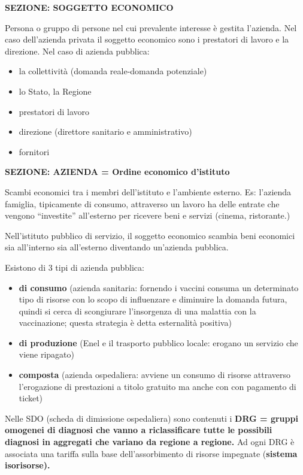 \documentclass[]{article}
\begin{document}
\textbf{SEZIONE: SOGGETTO ECONOMICO}

Persona o gruppo di persone nel cui prevalente interesse è gestita
l'azienda. Nel caso dell'azienda privata il soggetto economico sono i
prestatori di lavoro e la direzione. Nel caso di azienda pubblica:

\begin{itemize}
\item
  la collettività (domanda reale-domanda potenziale)
\item
  lo Stato, la Regione
\item
  prestatori di lavoro
\item
  direzione (direttore sanitario e amministrativo)
\item
  fornitori
\end{itemize}

\textbf{SEZIONE: AZIENDA = Ordine economico d'istituto}

Scambi economici tra i membri dell'istituto e l'ambiente esterno. Es:
l'azienda famiglia, tipicamente di consumo, attraverso un lavoro ha
delle entrate che vengono ``investite'' all'esterno per ricevere beni e
servizi (cinema, ristorante.)

Nell'istituto pubblico di servizio, il soggetto economico scambia beni
economici sia all'interno sia all'esterno diventando un'azienda
pubblica.

Esistono di 3 tipi di azienda pubblica:

\begin{itemize}
\item
  \textbf{di consumo} (azienda sanitaria: fornendo i vaccini consuma un
  determinato tipo di risorse con lo scopo di influenzare e diminuire la
  domanda futura, quindi si cerca di scongiurare l'insorgenza di una
  malattia con la vaccinazione; questa strategia è detta esternalità
  positiva)
\item
  \textbf{di produzione} (Enel e il trasporto pubblico locale: erogano
  un servizio che viene ripagato)
\item
  \textbf{composta} (azienda ospedaliera: avviene un consumo di risorse
  attraverso l'erogazione di prestazioni a titolo gratuito ma anche con
  con pagamento di ticket)
\end{itemize}

Nelle SDO (scheda di dimissione ospedaliera) sono contenuti i
\textbf{DRG = gruppi omogenei di diagnosi che vanno a riclassificare
tutte le possibili diagnosi in aggregati che variano da regione a
regione.} Ad ogni DRG è associata una tariffa sulla base
dell'assorbimento di risorse impegnate (\textbf{sistema isorisorse).}
\end{document}

